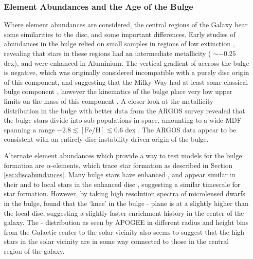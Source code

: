 \subsubsection{Element Abundances and the Age of the Bulge}
Where element abundances are considered, the central regions of the Galaxy bear some similarities to the disc, and some important differences. Early studies of abundances in the bulge relied on small samples in regions of low extinction \citep[e.g.][]{1994ApJS...91..749M}, revealing that stars in these regions had an intermediate metallicity (\feh{} $\sim -0.25$ dex), and were enhanced in Aluminium. The vertical gradient of \feh{} accross the bulge is negative, which was originally considered incompatible with a purely disc origin of this component, and suggesting that the Milky Way had at least some classical bulge component \citep[e.g.][]{2008A&A...486..177Z}, however the kinematics of the bulge place very low upper limits on the mass of this component \citep[e.g. $\sim 8\%$;][]{2010ApJ...720L..72S}. A closer look at the metallicity distribution in the bulge with better data from the ARGOS survey revealed that the bulge stars divide into sub-populations in \feh{} space, amounting to a wide MDF spanning a range $-2.8 \lesssim \mathrm{[Fe/H]}\lesssim 0.6$ dex \citep{2013MNRAS.430..836N}. The ARGOS data appear to be consistent with an entirely disc instability driven origin of the bulge.

Alternate element abundances which provide a way to test models for the bulge formation are $\alpha$-elements, which trace star formation as described in Section \ref{sec:discabundances}. Many bulge stars have enhanced \afe{}, and appear similar in their \afe{} and \feh{} to local stars in the \afe{} enhanced disc \citep{2010A&A...513A..35A,2015A&A...584A..46G}, suggesting a similar timescale for star formation. However, by taking high resolution spectra of microlensed dwarfs in the bulge, \citet{2013A&A...549A.147B} found that the `knee' in the bulge \afe{}-\feh{} plane is at a slightly higher \feh{} than the local disc, suggesting a slightly faster enrichment history in the center of the galaxy. The \afe{}-\feh{} distribution as seen by APOGEE in different radius and height bins from the Galactic center to the solar vicinity \citep{2016PASA...33...22N} also seems to suggest that the high \afe{} stars in the solar vicinity are in some way connected to those in the central region of the galaxy.


